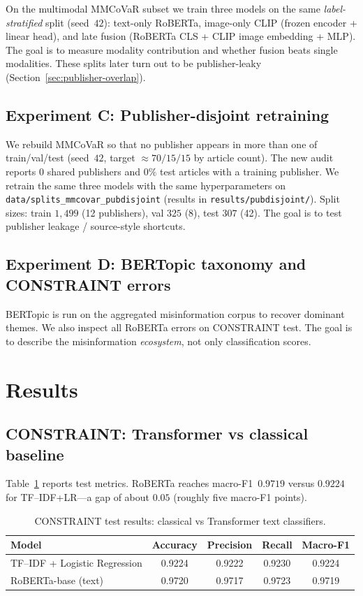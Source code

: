 \documentclass[12pt, a4paper]{report}
\begin{document}
On the multimodal MMCoVaR subset we train three models on the same \emph{label-stratified} split (seed~$42$):
text-only RoBERTa, image-only CLIP (frozen encoder + linear head), and late fusion (RoBERTa CLS + CLIP image embedding + MLP).
The goal is to measure modality contribution and whether fusion beats single modalities.
These splits later turn out to be publisher-leaky (Section~\ref{sec:publisher-overlap}).

\subsection{Experiment C: Publisher-disjoint retraining}

We rebuild MMCoVaR so that no publisher appears in more than one of train/val/test (seed~$42$, target $\approx 70/15/15$ by article count).
The new audit reports $0$ shared publishers and $0\%$ test articles with a training publisher.
We retrain the same three models with the same hyperparameters on \texttt{data/splits\_mmcovar\_pubdisjoint} (results in \texttt{results/pubdisjoint/}).
Split sizes: train $1{,}499$ (12 publishers), val $325$ (8), test $307$ (42).
The goal is to test publisher leakage / source-style shortcuts.

\subsection{Experiment D: BERTopic taxonomy and CONSTRAINT errors}

BERTopic is run on the aggregated misinformation corpus to recover dominant themes.
We also inspect all RoBERTa errors on CONSTRAINT test.
The goal is to describe the misinformation \emph{ecosystem}, not only classification scores.

\section{Results}
\label{sec:results}

\subsection{CONSTRAINT: Transformer vs classical baseline}

Table~\ref{tab:constraint-results} reports test metrics.
RoBERTa reaches macro-F1~$0.9719$ versus $0.9224$ for TF--IDF+LR---a gap of about $0.05$ (roughly five macro-F1 points).

\begin{table}[htbp]
\centering
\caption{CONSTRAINT test results: classical vs Transformer text classifiers.}
\label{tab:constraint-results}
\begin{tabular}{lcccc}
\hline
Model & Accuracy & Precision & Recall & Macro-F1 \\
\hline
TF--IDF + Logistic Regression & 0.9224 & 0.9222 & 0.9230 & 0.9224 \\
RoBERTa-base (text) & 0.9720 & 0.9717 & 0.9723 & 0.9719 \\
\hline
\end{tabular}
\end{table}
\end{document}
